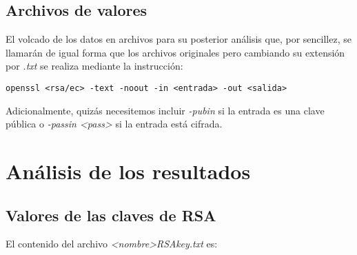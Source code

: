\documentclass[a4paper, 11pt]{article}
\begin{document}
	\subsection{Archivos de valores}
		El volcado de los datos en archivos para su posterior análisis que, por sencillez, se llamarán de igual forma que los
		archivos originales pero cambiando su extensión por \textit{.txt} se realiza mediante la instrucción: \\
		\begin{small}
			\verb|openssl <rsa/ec> -text -noout -in <entrada> -out <salida>|
		\end{small}

		Adicionalmente, quizás necesitemos incluir \textit{-pubin} si la entrada es una clave pública o
		\textit{-passin <pass>} si la entrada está cifrada.

\section{Análisis de los resultados}
	\subsection{Valores de las claves de RSA}
		El contenido del archivo \textit{<nombre>RSAkey.txt} es:
		
		
\end{document}
